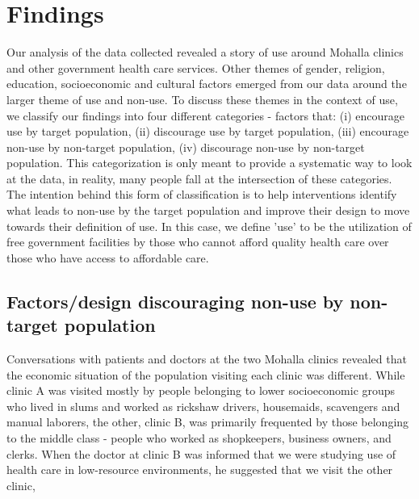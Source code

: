 \section{Findings}
\textcolor{red}{}
Our analysis of the data collected revealed a story of use around Mohalla clinics and other government health care services. Other themes of gender, religion, education, socioeconomic and cultural factors emerged from our data around the larger theme of use and non-use. To discuss these themes in the context of use, we classify our findings into four different categories - factors that: (i) encourage use by target population, (ii) discourage use by target population, (iii) encourage non-use by non-target population, (iv) discourage non-use by non-target population. This categorization is only meant to provide a systematic way to look at the data, in reality, many people fall at the intersection of these categories. The intention behind this form of classification is to help interventions identify what leads to non-use by the target population and improve their design to move towards their definition of use. In this case, we define 'use' to be the utilization of free government facilities by those who cannot afford quality health care over those who have access to affordable care.

\subsection{Factors/design discouraging non-use by non-target population}
Conversations with patients and doctors at the two Mohalla clinics revealed that the economic situation of the population visiting each clinic was different. While clinic A was visited mostly by people belonging to lower socioeconomic groups who lived in slums and worked as rickshaw drivers, housemaids, scavengers and manual laborers, the other, clinic B, was primarily frequented by those belonging to the middle class - people who worked as shopkeepers, business owners, and clerks. When the doctor at clinic B was informed that we were studying use of health care in low-resource environments, he suggested that we visit the other clinic, 

